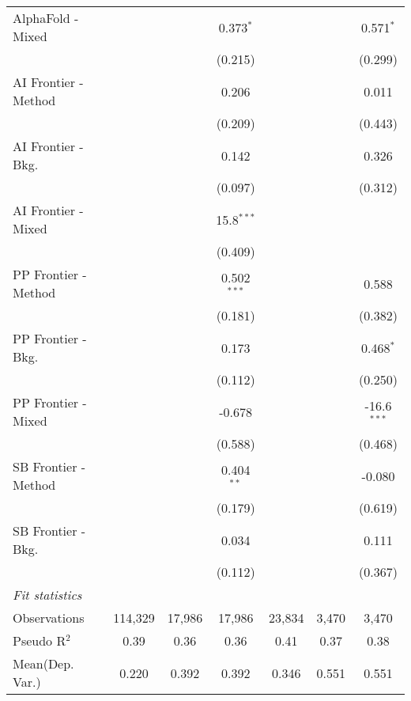 \begin{tabular}{lcccccc}
   AlphaFold - Mixed    &               &               & 0.373$^{*}$   &               &             & 0.571$^{*}$\\   
                        &               &               & (0.215)       &               &             & (0.299)\\   
   AI Frontier - Method &               &               & 0.206         &               &             & 0.011\\   
                        &               &               & (0.209)       &               &             & (0.443)\\   
   AI Frontier - Bkg.   &               &               & 0.142         &               &             & 0.326\\   
                        &               &               & (0.097)       &               &             & (0.312)\\   
   AI Frontier - Mixed  &               &               & 15.8$^{***}$  &               &             &   \\   
                        &               &               & (0.409)       &               &             &   \\   
   PP Frontier - Method &               &               & 0.502$^{***}$ &               &             & 0.588\\   
                        &               &               & (0.181)       &               &             & (0.382)\\   
   PP Frontier - Bkg.   &               &               & 0.173         &               &             & 0.468$^{*}$\\   
                        &               &               & (0.112)       &               &             & (0.250)\\   
   PP Frontier - Mixed  &               &               & -0.678        &               &             & -16.6$^{***}$\\   
                        &               &               & (0.588)       &               &             & (0.468)\\   
   SB Frontier - Method &               &               & 0.404$^{**}$  &               &             & -0.080\\   
                        &               &               & (0.179)       &               &             & (0.619)\\   
   SB Frontier - Bkg.   &               &               & 0.034         &               &             & 0.111\\   
                        &               &               & (0.112)       &               &             & (0.367)\\   
   \midrule
   \emph{Fit statistics}\\
   Observations         & 114,329       & 17,986        & 17,986        & 23,834        & 3,470       & 3,470\\  
   Pseudo R$^2$         & 0.39          & 0.36          & 0.36          & 0.41          & 0.37        & 0.38\\  
Mean(Dep. Var.) & 0.220 & 0.392 & 0.392 & 0.346 & 0.551 & 0.551 \\
   

\end{tabular}
